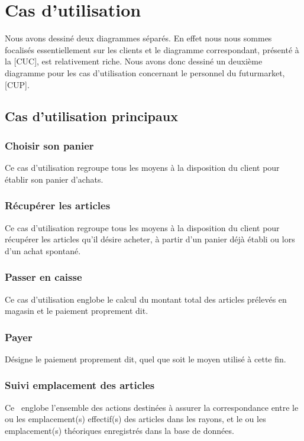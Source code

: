\chapter{Cas d'utilisation}
Nous avons dessiné deux diagrammes séparés.
En effet nous nous sommes focalisés essentiellement sur les clients et le diagramme correspondant, présenté à la [CUC], est relativement riche.
Nous avons donc dessiné un deuxième diagramme pour les cas d'utilisation concernant le personnel du futurmarket, [CUP].

\section{Cas d'utilisation principaux}

\subsection{Choisir son panier}
Ce cas d'utilisation regroupe tous les moyens à la disposition du client pour établir son panier d'achats.

\subsection{Récupérer les articles}
Ce cas d'utilisation regroupe tous les moyens à la disposition du client pour récupérer les articles qu'il désire acheter, à partir d'un panier déjà établi ou lors d'un achat spontané.

\subsection{Passer en caisse}
Ce cas d'utilisation englobe le calcul du montant total des articles prélevés en magasin et le paiement proprement dit.

\subsection{Payer}
Désigne le paiement proprement dit, quel que soit le moyen utilisé à cette fin.

\subsection{Suivi emplacement des articles}
Ce \cu\ englobe l'ensemble des actions destinées à assurer la correspondance entre le ou les emplacement(s) effectif(s) des articles dans les rayons, et le ou les emplacement(s) théoriques enregistrés dans la base de données.

